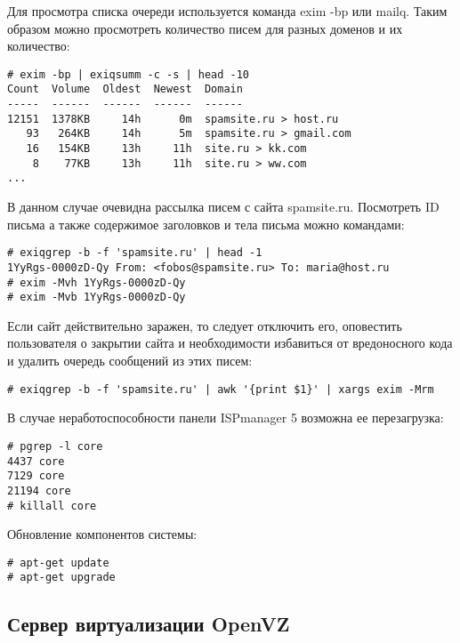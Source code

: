 Для просмотра списка очереди используется команда exim -bp или mailq.
Таким образом можно просмотреть количество писем для разных доменов и их количество:
\begin{lstlisting}
# exim -bp | exiqsumm -c -s | head -10
Count  Volume  Oldest  Newest  Domain
-----  ------  ------  ------  ------
12151  1378KB     14h      0m  spamsite.ru > host.ru
   93   264KB     14h      5m  spamsite.ru > gmail.com
   16   154KB     13h     11h  site.ru > kk.com
    8    77KB     13h     11h  site.ru > ww.com
...
\end{lstlisting}

В данном случае очевидна рассылка писем с сайта spamsite.ru.
Посмотреть ID письма а также содержимое заголовков и тела письма можно командами:
\begin{lstlisting}
# exiqgrep -b -f 'spamsite.ru' | head -1
1YyRgs-0000zD-Qy From: <fobos@spamsite.ru> To: maria@host.ru
# exim -Mvh 1YyRgs-0000zD-Qy
# exim -Mvb 1YyRgs-0000zD-Qy
\end{lstlisting}

Если сайт действительно заражен, то следует отключить его, оповестить пользователя о закрытии сайта и необходимости избавиться от вредоносного кода и удалить очередь сообщений из этих писем:
\begin{lstlisting}
# exiqgrep -b -f 'spamsite.ru' | awk '{print $1}' | xargs exim -Mrm
\end{lstlisting}

В случае неработоспособности панели ISPmanager 5 возможна ее перезагрузка:
\begin{lstlisting}
# pgrep -l core
4437 core
7129 core
21194 core
# killall core
\end{lstlisting}

Обновление компонентов системы:
\begin{lstlisting}
# apt-get update
# apt-get upgrade
\end{lstlisting}

\subsection{Сервер виртуализации OpenVZ}



\clearpage
